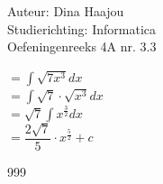 \documentclass[a4paper]{article}
\begin{document}
\noindent \large Auteur: Dina Haajou \\
\noindent \large Studierichting: Informatica\\
\noindent \large Oefeningenreeks 4A nr. 3.3\\

\medskip

\normalsize

$= \displaystyle\int \sqrt{7x^3} dx$ \\

$= \displaystyle\int \sqrt{7} \cdot \sqrt{x^3} dx$ \\

$= \sqrt{7} \displaystyle\int x^{\tfrac{3}{2}} dx$ \\

$= \dfrac{2\sqrt{7}}{5} \cdot x^{\tfrac{5}{2}} + c$

\begin{thebibliography}{999}
\end{thebibliography}
\end{document}
